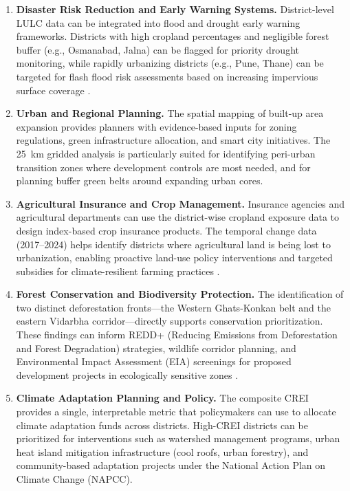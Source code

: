 \documentclass[12pt,a4paper]{article}
\begin{document}
\begin{enumerate}
    \item \textbf{Disaster Risk Reduction and Early Warning Systems.} District-level LULC data can be integrated into flood and drought early warning frameworks. Districts with high cropland percentages and negligible forest buffer (e.g., Osmanabad, Jalna) can be flagged for priority drought monitoring, while rapidly urbanizing districts (e.g., Pune, Thane) can be targeted for flash flood risk assessments based on increasing impervious surface coverage \citep{ipcc2022}.

    \item \textbf{Urban and Regional Planning.} The spatial mapping of built-up area expansion provides planners with evidence-based inputs for zoning regulations, green infrastructure allocation, and smart city initiatives. The 25~km gridded analysis is particularly suited for identifying peri-urban transition zones where development controls are most needed, and for planning buffer green belts around expanding urban cores.

    \item \textbf{Agricultural Insurance and Crop Management.} Insurance agencies and agricultural departments can use the district-wise cropland exposure data to design index-based crop insurance products. The temporal change data (2017--2024) helps identify districts where agricultural land is being lost to urbanization, enabling proactive land-use policy interventions and targeted subsidies for climate-resilient farming practices \citep{mall2006water}.

    \item \textbf{Forest Conservation and Biodiversity Protection.} The identification of two distinct deforestation fronts---the Western Ghats-Konkan belt and the eastern Vidarbha corridor---directly supports conservation prioritization. These findings can inform REDD+ (Reducing Emissions from Deforestation and Forest Degradation) strategies, wildlife corridor planning, and Environmental Impact Assessment (EIA) screenings for proposed development projects in ecologically sensitive zones \citep{myers2000biodiversity}.

    \item \textbf{Climate Adaptation Planning and Policy.} The composite CREI provides a single, interpretable metric that policymakers can use to allocate climate adaptation funds across districts. High-CREI districts can be prioritized for interventions such as watershed management programs, urban heat island mitigation infrastructure (cool roofs, urban forestry), and community-based adaptation projects under the National Action Plan on Climate Change (NAPCC).


\end{enumerate}
\end{document}
